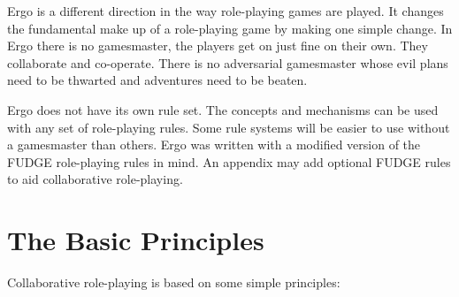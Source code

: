 \documentclass[twoside]{book}
\begin{document}
Ergo is a different direction in the way role-playing games are
played. It changes the fundamental make up of a role-playing game by
making one simple change. In Ergo there is no gamesmaster, the players
get on just fine on their own. They collaborate and co-operate. There
is no adversarial gamesmaster whose evil plans need to be thwarted and
adventures need to be beaten.

Ergo does not have its own rule set. The concepts and mechanisms can
be used with any set of role-playing rules. Some rule systems will be
easier to use without a gamesmaster than others. Ergo was written with
a modified version of the FUDGE role-playing rules in mind. An
appendix may add optional FUDGE rules to aid collaborative
role-playing.

\section{The Basic Principles}

Collaborative role-playing is based on some simple principles:
\end{document}
